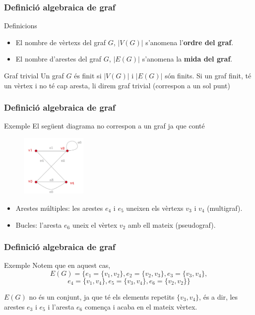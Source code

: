 \documentclass{beamer}
\begin{document}
\begin{frame}
\frametitle{Definició algebraica de graf}

\begin{block}{Definicions}
\begin{itemize}
\item El nombre de vèrtexs del graf $G$, $|V(G)|$ s'anomena l'\textbf{ordre del graf}. 
\item El nombre d'arestes del graf $G$, $|E(G)|$ s'anomena la \textbf{mida del graf}.
\end{itemize}
\end{block}

\begin{block}{Graf trivial}
 Un graf $G$ és finit si $|V(G)|$ i $|E(G)|$ són finits. Si un graf finit, té un vèrtex i no té cap aresta, li direm graf trivial (correspon a un sol punt)
\end{block}
\end{frame}





\begin{frame}
\frametitle{Definició algebraica de graf}

\begin{block}{Exemple}
El següent diagrama no correspon a un graf ja que conté
\begin{figure}[h]
 \label{fig:volum}
\centering
\includegraphics[height=3cm]{g4}
\end{figure}
\begin{itemize}
\item Arestes múltiples: les arestes $e_4$ i $e_5$ uneixen els vèrtexs $v_3$ i $v_4$ (multigraf).
\item Bucles: l'aresta $e_6$ uneix el vèrtex $v_2$ amb ell mateix (pseudograf). 
\end{itemize}
\end{block}
\end{frame}




\begin{frame}
\frametitle{Definició algebraica de graf}

\begin{block}{Exemple}
Notem que en aquest cas, 
\[E(G) = \{e_1=\{v_1,v_2\}, e_2=\{v_2,v_3\}, e_3 = \{v_3,v_4\}, \]
\[e_4 =  \{v_1,v_4\} , e_5 = \{v_3,v_4\}, e_6 = \{v_2,v_2\}\}\]

$E(G)$ no és un conjunt, ja que té els elements repetits $\{v_3,v_4\}$, és a dir, les arestes $e_3$ i $e_5$ i l'aresta $e_6$ comença i acaba en el mateix vèrtex. 

\end{block}
\end{frame}
\end{document}
